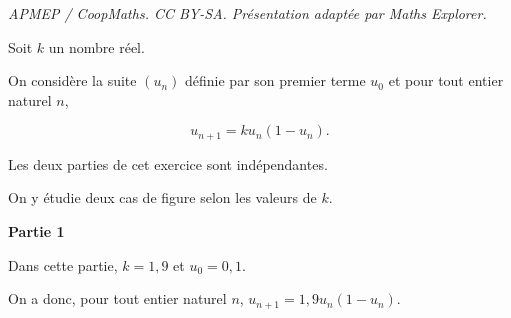 \documentclass[10pt]{article}
\begin{document}
\noindent\textit{APMEP / CoopMaths. CC BY-SA. Présentation adaptée par Maths Explorer.}\par\medskip
\medskip

Soit $k$ un nombre réel.

On considère la suite $\left(u_n\right)$ définie par son premier terme $u_0$ et pour tout entier naturel $n$,

\[u_{n+1} = ku_n\left(1- u_n\right).\]

Les deux parties de cet exercice sont indépendantes. 

On y étudie deux cas de figure selon les valeurs de $k$.

\bigskip

\textbf{Partie 1}

\medskip

Dans cette partie, $k = 1,9$ et $u_0 = 0,1$.

On a donc,  pour tout entier naturel $n$,\: $u_{n+1} = 1,9u_n\left(1 - u_n\right)$.

\medskip
\end{document}
